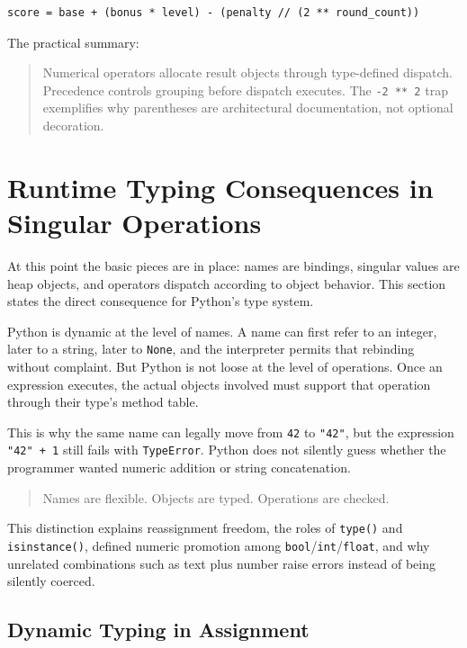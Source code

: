 \documentclass[a4paper,twoside]{report}
\begin{document}
\begin{verbatim}
score = base + (bonus * level) - (penalty // (2 ** round_count))
\end{verbatim}

The practical summary:

\begin{quote}
Numerical operators allocate result objects through type-defined dispatch. Precedence controls grouping before dispatch executes. The \texttt{-2 ** 2} trap exemplifies why parentheses are architectural documentation, not optional decoration.
\end{quote}


\section{Runtime Typing Consequences in Singular Operations}

At this point the basic pieces are in place: names are bindings, singular values are heap objects, and operators dispatch according to object behavior. This section states the direct consequence for Python's type system.

Python is dynamic at the level of names. A name can first refer to an integer, later to a string, later to \texttt{None}, and the interpreter permits that rebinding without complaint. But Python is not loose at the level of operations. Once an expression executes, the actual objects involved must support that operation through their type's method table.

This is why the same name can legally move from \texttt{42} to \texttt{"42"}, but the expression \texttt{"42" + 1} still fails with \texttt{TypeError}. Python does not silently guess whether the programmer wanted numeric addition or string concatenation.

\begin{quote}
Names are flexible. Objects are typed. Operations are checked.
\end{quote}

This distinction explains reassignment freedom, the roles of \texttt{type()} and \texttt{isinstance()}, defined numeric promotion among \texttt{bool}/\texttt{int}/\texttt{float}, and why unrelated combinations such as text plus number raise errors instead of being silently coerced.


\subsection{Dynamic Typing in Assignment}
\end{document}
